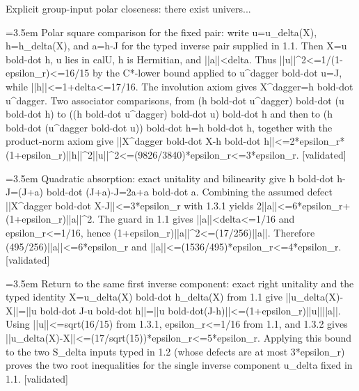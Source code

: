 \documentclass{article}
\newcommand{\step}[1]{\par\noindent\hangindent=3.5em\hangafter=1%
  \makebox[3.5em][l]{\textbf{#1.}}}
\newcommand{\steptag}[1]{\hfill{\small\textsf{[#1]}}}
\begin{document}
\begin{proofbox}{Explicit group-input polar closeness: there exist univers...}
\step{1.3.1} Polar square comparison for the fixed pair: write u=u\_delta(X), h=h\_delta(X), and a=h-J for the typed inverse pair supplied in 1.1. Then X=u bold-dot h, u lies in calU, h is Hermitian, and ||a||<delta. Thus ||u||\textasciicircum{}2<=1/(1-epsilon\_r)<=16/15 by the C*-lower bound applied to u\textasciicircum{}dagger bold-dot u=J, while ||h||<=1+delta<=17/16. The involution axiom gives X\textasciicircum{}dagger=h bold-dot u\textasciicircum{}dagger. Two associator comparisons, from (h bold-dot u\textasciicircum{}dagger) bold-dot (u bold-dot h) to ((h bold-dot u\textasciicircum{}dagger) bold-dot u) bold-dot h and then to (h bold-dot (u\textasciicircum{}dagger bold-dot u)) bold-dot h=h bold-dot h, together with the product-norm axiom give ||X\textasciicircum{}dagger bold-dot X-h bold-dot h||<=2*epsilon\_r*(1+epsilon\_r)||h||\textasciicircum{}2||u||\textasciicircum{}2<=(9826/3840)*epsilon\_r<=3*epsilon\_r. \steptag{validated} \\[4pt]
\step{1.3.2} Quadratic absorption: exact unitality and bilinearity give h bold-dot h-J=(J+a) bold-dot (J+a)-J=2a+a bold-dot a. Combining the assumed defect ||X\textasciicircum{}dagger bold-dot X-J||<=3*epsilon\_r with 1.3.1 yields 2||a||<=6*epsilon\_r+(1+epsilon\_r)||a||\textasciicircum{}2. The guard in 1.1 gives ||a||<delta<=1/16 and epsilon\_r<=1/16, hence (1+epsilon\_r)||a||\textasciicircum{}2<=(17/256)||a||. Therefore (495/256)||a||<=6*epsilon\_r and ||a||<=(1536/495)*epsilon\_r<=4*epsilon\_r. \steptag{validated} \\[4pt]
\step{1.3.3} Return to the same first inverse component: exact right unitality and the typed identity X=u\_delta(X) bold-dot h\_delta(X) from 1.1 give ||u\_delta(X)-X||=||u bold-dot J-u bold-dot h||=||u bold-dot(J-h)||<=(1+epsilon\_r)||u||||a||. Using ||u||<=sqrt(16/15) from 1.3.1, epsilon\_r<=1/16 from 1.1, and 1.3.2 gives ||u\_delta(X)-X||<=(17/sqrt(15))*epsilon\_r<=5*epsilon\_r. Applying this bound to the two S\_delta inputs typed in 1.2 (whose defects are at most 3*epsilon\_r) proves the two root inequalities for the single inverse component u\_delta fixed in 1.1. \steptag{validated} \\[4pt]
\end{proofbox}
\end{document}
